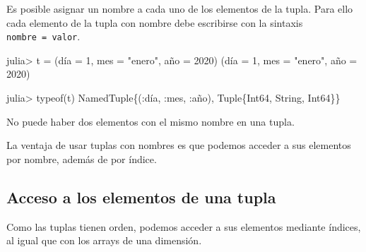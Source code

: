 \documentclass[
  letterpaper,
  DIV=11,
  numbers=noendperiod]{scrreprt}
\newenvironment{Shaded}{\begin{snugshade}}{\end{snugshade}}
\newcommand{\DataTypeTok}[1]{\textcolor[rgb]{0.68,0.00,0.00}{#1}}
\newcommand{\FloatTok}[1]{\textcolor[rgb]{0.68,0.00,0.00}{#1}}
\newcommand{\FunctionTok}[1]{\textcolor[rgb]{0.28,0.35,0.67}{#1}}
\newcommand{\NormalTok}[1]{\textcolor[rgb]{0.00,0.23,0.31}{#1}}
\newcommand{\OperatorTok}[1]{\textcolor[rgb]{0.37,0.37,0.37}{#1}}
\newcommand{\StringTok}[1]{\textcolor[rgb]{0.13,0.47,0.30}{#1}}
\begin{document}
Es posible asignar un nombre a cada uno de los elementos de la tupla.
Para ello cada elemento de la tupla con nombre debe escribirse con la
sintaxis \texttt{nombre\ =\ valor}.

\begin{Shaded}
\begin{Highlighting}[]
\NormalTok{julia}\OperatorTok{\textgreater{}}\NormalTok{ t }\OperatorTok{=}\NormalTok{ (día }\OperatorTok{=} \FloatTok{1}\NormalTok{, mes }\OperatorTok{=} \StringTok{"enero"}\NormalTok{, año }\OperatorTok{=}  \FloatTok{2020}\NormalTok{)}
\NormalTok{(día }\OperatorTok{=} \FloatTok{1}\NormalTok{, mes }\OperatorTok{=} \StringTok{"enero"}\NormalTok{, año }\OperatorTok{=} \FloatTok{2020}\NormalTok{)}

\NormalTok{julia}\OperatorTok{\textgreater{}} \FunctionTok{typeof}\NormalTok{(t)}
\DataTypeTok{NamedTuple}\NormalTok{\{(}\OperatorTok{:}\NormalTok{día, }\OperatorTok{:}\NormalTok{mes, }\OperatorTok{:}\NormalTok{año), }\DataTypeTok{Tuple}\NormalTok{\{}\DataTypeTok{Int64}\NormalTok{, }\DataTypeTok{String}\NormalTok{, }\DataTypeTok{Int64}\NormalTok{\}\}}
\end{Highlighting}
\end{Shaded}

\begin{tcolorbox}[enhanced jigsaw, colbacktitle=quarto-callout-warning-color!10!white, coltitle=black, opacityback=0, opacitybacktitle=0.6, bottomtitle=1mm, leftrule=.75mm, toprule=.15mm, bottomrule=.15mm, toptitle=1mm, breakable, colframe=quarto-callout-warning-color-frame, colback=white, rightrule=.15mm, titlerule=0mm, title=\textcolor{quarto-callout-warning-color}{\faExclamationTriangle}\hspace{0.5em}{Warning}, arc=.35mm, left=2mm]
No puede haber dos elementos con el mismo nombre en una tupla.
\end{tcolorbox}

La ventaja de usar tuplas con nombres es que podemos acceder a sus
elementos por nombre, además de por índice.

\hypertarget{acceso-a-los-elementos-de-una-tupla}{%
\subsection{Acceso a los elementos de una
tupla}\label{acceso-a-los-elementos-de-una-tupla}}

Como las tuplas tienen orden, podemos acceder a sus elementos mediante
índices, al igual que con los arrays de una dimensión.
\end{document}
